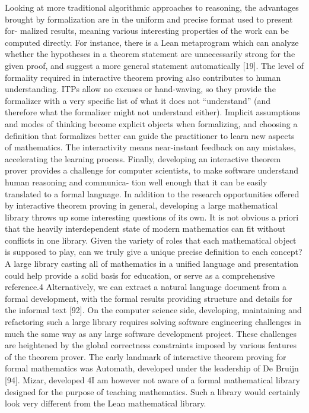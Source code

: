 \documentclass{book}
\theoremstyle{definition}
\begin{document}
Looking at more traditional algorithmic approaches to reasoning, the advantages brought by formalization are in the uniform and precise format used to present for- malized results, meaning various interesting properties of the work can be computed directly. For instance, there is a Lean metaprogram which can analyze whether the hypotheses in a theorem statement are unnecessarily strong for the given proof, and suggest a more general statement automatically [19].
The level of formality required in interactive theorem proving also contributes to human understanding. ITPs allow no excuses or hand-waving, so they provide the formalizer with a very specific list of what it does not “understand” (and therefore what the formalizer might not understand either). Implicit assumptions and modes of thinking become explicit objects when formalizing, and choosing a definition that formalizes better can guide the practitioner to learn new aspects of mathematics. The interactivity means near-instant feedback on any mistakes, accelerating the learning process. Finally, developing an interactive theorem prover provides a challenge for computer scientists, to make software understand human reasoning and communica- tion well enough that it can be easily translated to a formal language.
In addition to the research opportunities offered by interactive theorem proving in general, developing a large mathematical library throws up some interesting questions of its own. It is not obvious a priori that the heavily interdependent state of modern mathematics can fit without conflicts in one library. Given the variety of roles that each mathematical object is supposed to play, can we truly give a unique precise definition to each concept? A large library casting all of mathematics in a unified language and presentation could help provide a solid basis for education, or serve as a comprehensive reference.4 Alternatively, we can extract a natural language document from a formal development, with the formal results providing structure and details for the informal text [92]. On the computer science side, developing, maintaining and refactoring such a large library requires solving software engineering challenges in much the same way as any large software development project. These challenges are heightened by the global correctness constraints imposed by various features of the theorem prover.
The early landmark of interactive theorem proving for formal mathematics was Automath, developed under the leadership of De Bruijn [94]. Mizar, developed
4I am however not aware of a formal mathematical library designed for the purpose of teaching mathematics. Such a library would certainly look very different from the Lean mathematical library.
\end{document}
